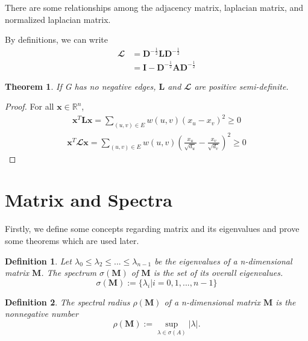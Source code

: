 \documentclass[senior,final,11pt]{iscs-thesis}
\newtheorem{theorem}{Theorem}
\newtheorem{definition}{Definition}
\begin{document}
There are some relationships among the adjacency matrix, laplacian matrix, and  normalized laplacian matrix.

By definitions, we can write
\begin{align*}
    \mathbfcal{L} &= \mathbf{D}^{-\frac{1}{2}}\mathbf{L}\mathbf{D}^{-\frac{1}{2}}\\
        &= \mathbf{I} - \mathbf{D}^{-\frac{1}{2}}\mathbf{A}\mathbf{D}^{-\frac{1}{2}}
\end{align*}


\begin{theorem}
    If G has no negative edges, $\mathbf{L}$ and $\mathbfcal{L}$ are positive semi-definite.
\end{theorem}
\begin{proof}
    For all $\mathbf{x} \in \mathbb{R}^n$,
    \begin{align*}
        \mathbf{x}^T \mathbf{L} \mathbf{x} = \sum_{(u,v) \in E} w(u,v)(x_u - x_v)^2 \geq 0
    \end{align*}
    \begin{align*}
        \mathbf{x}^T \mathbfcal{L} \mathbf{x} = \sum_{(u,v) \in E} w(u,v)\left(\frac{x_u}{\sqrt{d_u}} - \frac{x_v}{\sqrt{d_v}}\right)^2 \geq 0
    \end{align*}
\end{proof}

\section{Matrix and Spectra}
Firstly, we define some concepts regarding matrix and its eigenvalues and prove some theorems which are used later.
\begin{definition}
    Let $\lambda_0 \leq \lambda_2 \leq ... \leq \lambda_{n-1}$ be the eigenvalues of a n-dimensional matrix $\mathbf{M}$. The spectrum $\sigma(\mathbf{M})$ of $\mathbf{M}$ is the set of its overall eigenvalues.
    \[\sigma(\mathbf{M}) := \{\lambda_i | i=0,1,...,n-1\}\]
\end{definition}
\begin{definition}
    The spectral radius $\rho(\mathbf{M})$ of a n-dimensional matrix $\mathbf{M}$ is the nonnegative number
    \[\rho(\mathbf{M}):=\sup_{\lambda \in \sigma(A)} |\lambda|.\]
\end{definition}
\end{document}
